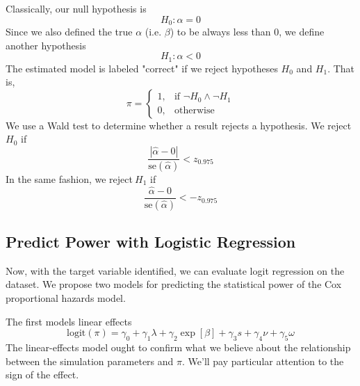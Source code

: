 Classically, our null hypothesis is
%
\begin{equation}
    H_0 : \alpha = 0 
\end{equation}
%
Since we also defined the true $\alpha$ (i.e. $\beta$) to be always less than 0, we define another hypothesis
%
\begin{equation}
    H_1 : \alpha < 0 
\end{equation}
%
The estimated model is labeled "correct" if we reject hypotheses $H_0$ and $H_1$. That is,
%
\begin{equation}
  \pi =
  \begin{cases}
    1, & \text{if } \neg H_0 \land \neg H_1 \\
    0, & \text{otherwise}
  \end{cases}
\end{equation}
%
We use a Wald test \cite{wald} to determine whether a result rejects a hypothesis. We reject $H_0$ if 
%
$$
 \frac{| \hat \alpha - 0 |}{\text{se}(\hat \alpha)} < z_{0.975}
$$
%
In the same fashion, we reject\footnotemark $~H_1$ if
%
$$
 \frac{ \hat \alpha - 0 }{\text{se}(\hat \alpha)} < -z_{0.975}
$$
%
\subsection{Predict Power with Logistic Regression}

Now, with the target variable identified, we can evaluate logit regression on the dataset. We propose two models for predicting the statistical power of the Cox proportional hazards model. 

The first models linear effects
%
\begin{equation}
    \text{logit}(\pi)  = \gamma_{0} + 
        \gamma_{1} \lambda + 
        \gamma_{2} \exp[\beta] + 
        \gamma_{3} s + 
        \gamma_{4} \nu +
        \gamma_{5} \omega
\end{equation}
%
The linear-effects model ought to confirm what we believe about the relationship between the simulation parameters and $\pi$. We'll pay particular attention to the sign of the effect. 

